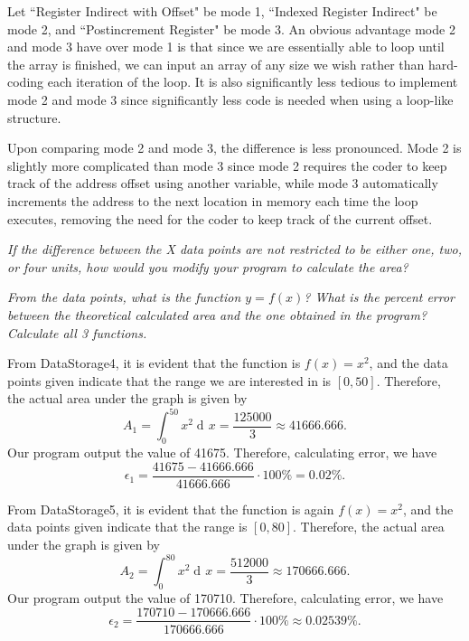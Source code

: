 \documentclass[10pt, letterpaper, titlepage]{article} %
\DeclareMathOperator{\di}{d\!} %
\begin{document}
\begin{multicols*}{2}
Let ``Register Indirect with Offset" be mode 1, ``Indexed Register Indirect" be mode 2, and ``Postincrement Register" be mode 3. 
An obvious advantage mode 2 and mode 3 have over mode 1 is that since we are essentially able to loop until the array is finished, we can input an array of any size we wish rather than hard-coding each iteration of the loop. 
It is also significantly less tedious to implement mode 2 and mode 3 since significantly less code is needed when using a loop-like structure. 

Upon comparing mode 2 and mode 3, the difference is less pronounced. 
Mode 2 is slightly more complicated than mode 3 since mode 2 requires the coder to keep track of the address offset using another variable, while mode 3 automatically increments the address to the next location in memory each time the loop executes, removing the need for the coder to keep track of the current offset.

\textit{If the difference between the X data points are not restricted to be either one, two, or four units, how would you modify your program to calculate the area?}

\textit{From the data points, what is the function $y = f(x)$? What is the percent error between the theoretical calculated area and the one obtained in the program? Calculate all 3 functions.}

From DataStorage4, it is evident that the function is $f(x) = x^2$, and the data points given indicate that the range we are interested in is $[0, 50]$. Therefore, the actual area under the graph is given by
\begin{equation}
	A_1 = \int_0^{50} x^2 \di x = \dfrac{125000}{3} \approx 41666.666.
\end{equation} 
Our program output the value of 41675. Therefore, calculating error, we have
\begin{equation}
	\epsilon_1 = \dfrac{41675 - 41666.666}{41666.666} \cdot 100\% = 0.02\%. 
\end{equation}

From DataStorage5, it is evident that the function is again $f(x) = x^2$, and the data points given indicate that the range is $[0, 80]$. Therefore, the actual area under the graph is given by
\begin{equation}
	A_2 = \int_0^{80} x^2 \di x = \dfrac{512000}{3} \approx 170666.666.
\end{equation} 
Our program output the value of 170710. Therefore, calculating error, we have
\begin{equation}
	\epsilon_2 = \dfrac{170710 - 170666.666}{170666.666} \cdot 100\% \approx 0.02539\%. 
\end{equation}


\end{multicols*}
\end{document}
